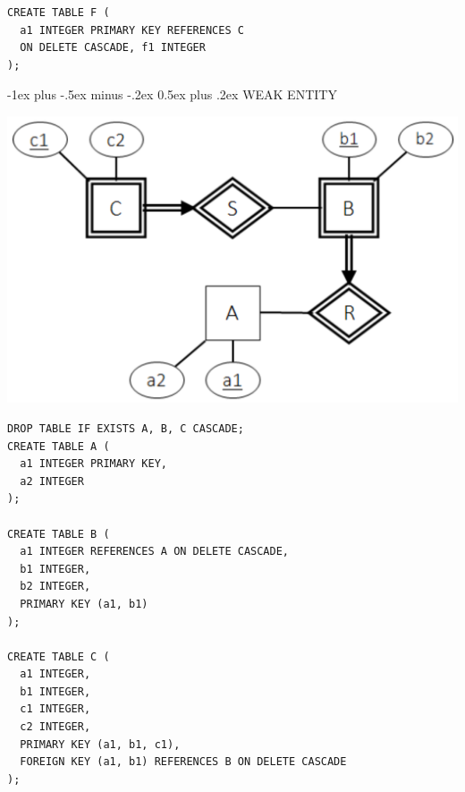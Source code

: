\documentclass[10pt, landscape]{article}
\makeatletter
\renewcommand{\section}{\@startsection{section}{1}{0mm}%
  {-1ex plus -.5ex minus -.2ex}%
  {0.5ex plus .2ex}%
{\normalfont\large\bfseries}}
\makeatother
\begin{document}
\begin{multicols*}{3}
\begin{lstlisting}[style=mySQL]
CREATE TABLE F (
  a1 INTEGER PRIMARY KEY REFERENCES C
  ON DELETE CASCADE, f1 INTEGER
);
  \end{lstlisting}

  \section{WEAK ENTITY}
  \begin{tightcenter}
    \includegraphics[width=0.9\linewidth]{cs2102-er-model-weak-entity.png} 
  \end{tightcenter}
  \begin{lstlisting}[style=mySQL]
DROP TABLE IF EXISTS A, B, C CASCADE;
CREATE TABLE A (
  a1 INTEGER PRIMARY KEY,
  a2 INTEGER 
);

CREATE TABLE B (
  a1 INTEGER REFERENCES A ON DELETE CASCADE,
  b1 INTEGER,
  b2 INTEGER,
  PRIMARY KEY (a1, b1) 
);

CREATE TABLE C ( 
  a1 INTEGER, 
  b1 INTEGER,
  c1 INTEGER,
  c2 INTEGER,
  PRIMARY KEY (a1, b1, c1),
  FOREIGN KEY (a1, b1) REFERENCES B ON DELETE CASCADE
);
  \end{lstlisting}

\end{multicols*}
\end{document}
